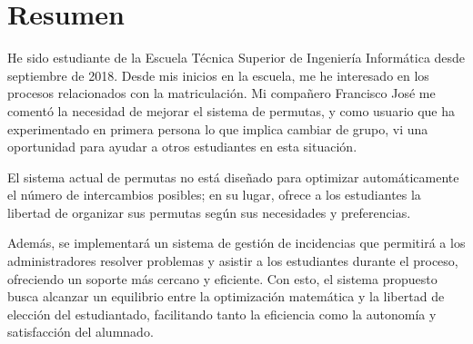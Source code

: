 \chapter*{Resumen}
He sido estudiante de la Escuela Técnica Superior de Ingeniería Informática desde septiembre de 2018. Desde mis inicios en la escuela, me he interesado en los procesos relacionados con la matriculación. Mi compañero Francisco José me comentó la necesidad de mejorar el sistema de permutas, y como usuario que ha experimentado en primera persona lo que implica cambiar de grupo, vi una oportunidad para ayudar a otros estudiantes en esta situación.

El sistema actual de permutas no está diseñado para optimizar automáticamente el número de intercambios posibles; en su lugar, ofrece a los estudiantes la libertad de organizar sus permutas según sus necesidades y preferencias.

Además, se implementará un sistema de gestión de incidencias que permitirá a los administradores resolver problemas y asistir a los estudiantes durante el proceso, ofreciendo un soporte más cercano y eficiente. Con esto, el sistema propuesto busca alcanzar un equilibrio entre la optimización matemática y la libertad de elección del estudiantado, facilitando tanto la eficiencia como la autonomía y satisfacción del alumnado.